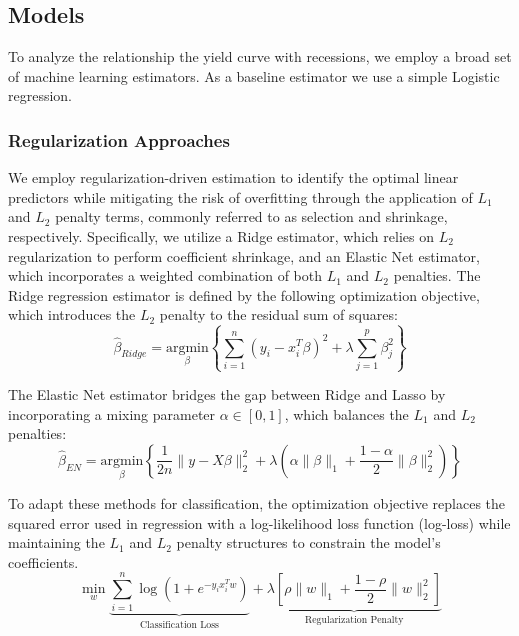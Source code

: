 \subsection{Models}
To analyze the relationship the yield curve with recessions, we employ a broad set of machine learning estimators. As a baseline estimator we use a simple Logistic regression.

\subsubsection{Regularization Approaches}

We employ regularization-driven estimation to identify the optimal linear predictors while mitigating the risk of overfitting through the application of $L_1$ and $L_2$ penalty terms, commonly referred to as selection and shrinkage, respectively. Specifically, we utilize a Ridge estimator, which relies on $L_2$ regularization to perform coefficient shrinkage, and an Elastic Net estimator, which incorporates a weighted combination of both $L_1$ and $L_2$ penalties. The Ridge regression estimator is defined by the following optimization objective, which introduces the $L_2$ penalty to the residual sum of squares:
\begin{equation}
\hat{\beta}_{Ridge} = \underset{\beta}{\text{argmin}} \left\{ \sum_{i=1}^{n} (y_i - x_i^T \beta)^2 + \lambda \sum_{j=1}^{p} \beta_j^2 \right\}
\end{equation}

The Elastic Net estimator bridges the gap between Ridge and Lasso by incorporating a mixing parameter $\alpha \in [0, 1]$, which balances the $L_1$ and $L_2$ penalties:
\begin{equation}
\hat{\beta}_{EN} = \underset{\beta}{\text{argmin}} \left\{ \frac{1}{2n} \|y - X\beta\|^2_2 + \lambda \left( \alpha \|\beta\|_1 + \frac{1-\alpha}{2} \|\beta\|^2_2 \right) \right\}
\end{equation}

To adapt these methods for classification, the optimization objective replaces the squared error used in regression with a log-likelihood loss function (log-loss) while maintaining the $L_1$ and $L_2$ penalty structures to constrain the model's coefficients.
\begin{equation}
\min_{w} \underbrace{\sum_{i=1}^{n} \log(1 + e^{-y_i x_i^T w})}_{\text{Classification Loss}} + \underbrace{\lambda \left[ \rho \|w\|_1 + \frac{1-\rho}{2} \|w\|_2^2 \right]}_{\text{Regularization Penalty}}
\end{equation}

